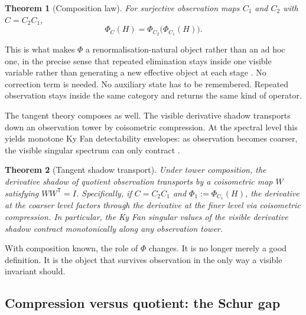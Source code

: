\documentclass[11pt]{article}
\numberwithin{equation}{section}
\theoremstyle{thmcompact}
\newtheorem{theorem}{Theorem}[section]
\theoremstyle{remark}
\begin{document}
\begin{theorem}[Composition law]
\label{thm:composition-law}
For surjective observation maps $C_1$ and $C_2$ with $C=C_2C_1$,
\begin{equation}
\Phi_C(H)
=
\Phi_{C_2}\!\bigl(\Phi_{C_1}(H)\bigr).
\end{equation}
\end{theorem}

This is what makes $\Phi$ a renormalisation-natural object rather than an ad hoc one, in the precise sense that repeated elimination stays inside one visible variable rather than generating a new effective object at each stage \cite{Kadanoff1966,WilsonKogut1974,Polchinski1984}. No correction term is needed. No auxiliary state has to be remembered. Repeated observation stays inside the same category and returns the same kind of operator.

The tangent theory composes as well. The visible derivative shadow transports down an observation tower by coisometric compression. At the spectral level this yields monotone Ky Fan detectability envelopes: as observation becomes coarser, the visible singular spectrum can only contract \cite{Fan1951,HornJohnson2013}.

\begin{theorem}[Tangent shadow transport]
\label{thm:shadow-transport}
Under tower composition, the derivative shadow of quotient observation transports by a coisometric map $W$ satisfying $WW^{\mathsf T} = I$. Specifically, if $C = C_2 C_1$ and $\Phi_1 := \Phi_{C_1}(H)$, the derivative at the coarser level factors through the derivative at the finer level via coisometric compression. In particular, the Ky Fan singular values of the visible derivative shadow contract monotonically along any observation tower.
\end{theorem}

With composition known, the role of $\Phi$ changes. It is no longer merely a good definition. It is the object that survives observation in the only way a visible invariant should.

\subsection{Compression versus quotient: the Schur gap}
\end{document}
